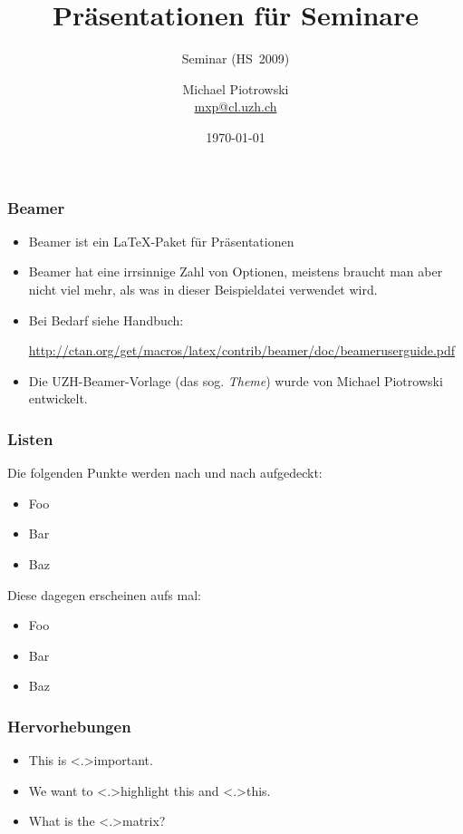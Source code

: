 \documentclass[t]{beamer} %
\title[Präsentationen]{Präsentationen für Seminare}
\subtitle{Seminar \q{Making Word Processors Process Words} (HS~2009)}
\institute{Institut für Computerlinguistik}
\author{Michael Piotrowski\\
  \href{mailto:mxp@cl.uzh.ch}{\ttfamily mxp@cl.uzh.ch}}
\date{\today}
\newcommand{\first}[1]{\emph{#1}}
\begin{document}
\maketitle

\begin{frame}
  \frametitle{Beamer}

  \begin{itemize}
  \item Beamer ist ein \LaTeX-Paket für Präsentationen
  \item Beamer hat eine irrsinnige Zahl von Optionen, meistens braucht
    man aber nicht viel mehr, als was in dieser Beispieldatei
    verwendet wird.
  \item Bei Bedarf siehe Handbuch:

    \url{http://ctan.org/get/macros/latex/contrib/beamer/doc/beameruserguide.pdf}
  \item Die UZH-Beamer-Vorlage (das sog. \first{Theme}) wurde von
    Michael Piotrowski entwickelt.
  \end{itemize}
\end{frame}

\begin{frame}
  \frametitle{Listen}

  Die folgenden Punkte werden nach und nach aufgedeckt:
  
  \begin{itemize}[<+->]
  \item Foo
  \item Bar
  \item Baz
  \end{itemize}

  Diese dagegen erscheinen aufs mal:

  \begin{itemize}[<*>]
  \item Foo
  \item Bar
  \item Baz
  \end{itemize}
\end{frame}

\begin{frame}
  \frametitle{Hervorhebungen}

  \begin{itemize}[<+->]
  \item This is \alert<.>{important}.
  \item We want to \alert<.>{highlight} this and \alert<.>{this}.
  \item What is the \alert<.>{matrix}?
  \end{itemize}
\end{frame}
\end{document}
